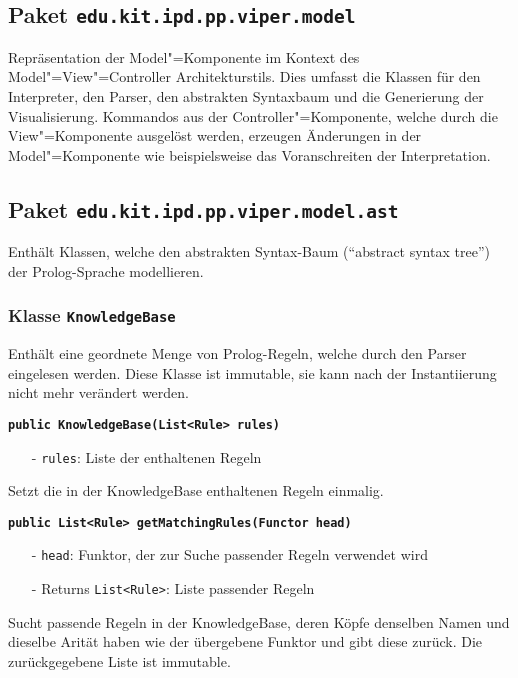 \documentclass[parskip=full,11pt,twoside]{scrartcl}
\begin{document}
\subsection{Paket \texttt{edu.kit.ipd.pp.viper.model}}

Repräsentation der Model"=Komponente im Kontext des Model"=View"=Controller Architekturstils. Dies umfasst die Klassen für den Interpreter, den Parser, den abstrakten Syntaxbaum und die Generierung der Visualisierung. Kommandos aus der Controller"=Komponente, welche durch die View"=Komponente ausgelöst werden, erzeugen Änderungen in der Model"=Komponente wie beispielsweise das Voranschreiten der Interpretation.

\subsection{Paket \texttt{edu.kit.ipd.pp.viper.model.ast}}

Enthält Klassen, welche den abstrakten Syntax-Baum (\enquote{abstract syntax tree}) der Prolog-Sprache modellieren.

\subsubsection{Klasse \texttt{KnowledgeBase}}
Enthält eine geordnete Menge von Prolog-Regeln, welche durch den Parser eingelesen werden. Diese Klasse ist immutable, sie kann nach der Instantiierung nicht mehr verändert werden.

\textbf{\texttt{public KnowledgeBase(List<Rule> rules)}}
\begin{itemize}[noitemsep]
	\item[-] \texttt{rules}: Liste der enthaltenen Regeln
\end{itemize}
Setzt die in der KnowledgeBase enthaltenen Regeln einmalig.

\textbf{\texttt{public List<Rule> getMatchingRules(Functor head)}}
\begin{itemize}[noitemsep]
	\item[-] \texttt{head}: Funktor, der zur Suche passender Regeln verwendet wird
	\item[-] Returns \texttt{List<Rule>}: Liste passender Regeln
\end{itemize}
Sucht passende Regeln in der KnowledgeBase, deren Köpfe denselben Namen und dieselbe Arität haben wie der übergebene Funktor und gibt diese zurück. Die zurückgegebene Liste ist immutable.
\end{document}
